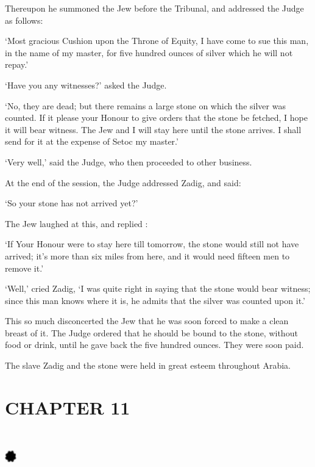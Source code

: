 \documentclass{article}
\begin{document}
\begin{center}
Thereupon he summoned the Jew before the Tribunal, and addressed the Judge as follows: 

`Most gracious Cushion upon the Throne of Equity, I have come to sue this man, 
in the name of my master, for five hundred ounces of silver which he will not repay.' 

`Have you any witnesses?' asked the Judge. 

`No, they are dead; but there remains a large stone on which the silver was counted. 
If it please your Honour to give orders that the stone be fetched, I hope it will 
bear witness. The Jew and I will stay here until the stone arrives. I shall send 
for it at the expense of Setoc my master.' 

`Very well,' said the Judge, who then proceeded to other business. 

At the end of the session, the Judge addressed Zadig, and said: 

`So your stone has not arrived yet?' 

The Jew laughed at this, and replied : 

`If Your Honour were to stay here till tomorrow, the stone would still not have 
arrived; it's more than six miles from here, and it would need fifteen men to remove 
it.' 

`Well,' cried Zadig, `I was quite right in saying that the stone would bear witness; 
since this man knows where it is, he admits that the silver was counted upon it.' 

This so much disconcerted the Jew that he was soon forced to make a clean breast 
of it. The Judge ordered that he should be bound to the stone, without food or 
drink, until he gave back the five hundred ounces. They were soon paid. 

The slave Zadig and the stone were held in great esteem throughout Arabia.\pagebreak{} 

\section*{\textbf{CHAPTER 11  }}

\section*{%
\includegraphics[width=14pt, height=15pt, keepaspectratio=true]{Zadig or L'Ingenu - Voltaire-fig014.jpg}
}


\end{center}
\end{document}
